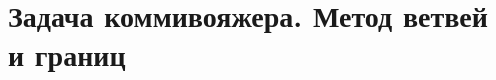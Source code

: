 \documentclass[discrete.tex]{subfiles}
\begin{document}
  \section{Задача коммивояжера. Метод ветвей и границ}
\end{document}
